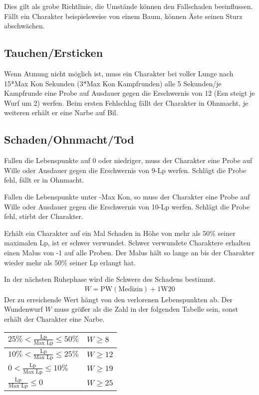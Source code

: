 \documentclass[../../Heldenanleitung2]{subfiles}
\begin{document}
Dies gilt als grobe Richtlinie, die Umstände können den Fallschaden beeinflussen. Fällt ein Charakter beispielsweise von einem Baum, können Äste seinen Sturz abschwächen.

\subsection{Tauchen/Ersticken}
Wenn Atmung nicht möglich ist, muss ein Charakter bei voller Lunge nach 15*Max Kon Sekunden (3*Max Kon Kampfrunden) alle 5 Sekunden/je Kampfrunde eine Probe auf Ausdauer gegen die Erschwernis von 12 (Esn steigt je Wurf um 2) werfen. Beim ersten Fehlschlag fällt der Charakter in Ohnmacht, je weiteren erhält er eine Narbe auf Bil.

\subsection{Schaden/Ohnmacht/Tod}
Fallen die Lebenspunkte auf 0 oder niedriger, muss der Charakter eine Probe auf Wille oder Ausdauer gegen die Erschwernis von 9-Lp werfen. Schlägt die Probe fehl, fällt er in Ohnmacht.

Fallen die Lebenspunkte unter -Max Kon, so muss der Charakter eine Probe auf Wille oder Ausdauer gegen die Erschwernis von 10-Lp werfen. Schlägt die Probe fehl, stirbt der Charakter.

Erhält ein Charakter auf ein Mal Schaden in Höhe von mehr als 50\% seiner maximalen Lp, ist er schwer verwundet. Schwer verwundete Charaktere erhalten einen Malus von -1 auf alle Proben. Der Malus hält so lange an bis der Charakter wieder mehr als 50\% seiner Lp erlangt hat.

In der nächsten Ruhephase wird die Schwere des Schadens bestimmt.
\begin{align*}
 W = \text{PW}\left(\text{Medizin}\right) + 1\text{W}20
\end{align*}
Der zu erreichende Wert hängt von den verlorenen Lebenspunkten ab. Der Wundenwurf $W$ muss größer als die Zahl in der folgenden Tabelle sein, sonst erhält der Charakter eine Narbe.
\begin{center}
\begin{tabular}{|l|l|}
\hline
$25 \% < \frac{\text{Lp}}{\text{Max Lp}} \le 50 \%$ & $W \ge 8$ \\ \hline
$10 \% < \frac{\text{Lp}}{\text{Max Lp}} \le 25 \%$ & $W \ge 12$ \\ \hline
$0 < \frac{\text{Lp}}{\text{Max Lp}} \le 10 \%$ & $W \ge 19$\\ \hline
$\frac{\text{Lp}}{\text{Max Lp}} \le 0$ & $W \ge 25$\\ \hline
\end{tabular}
\end{center}
\end{document}
